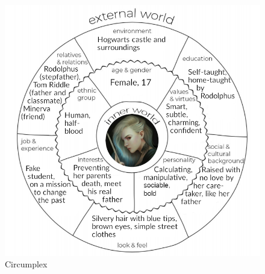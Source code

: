 \begin{figure}[H]
\includegraphics[max width=\textwidth]{../Pictures/Characters/Circumplexes/Delphini_circumplex.png} 
\captionsetup{labelformat=empty}
\caption{Circumplex}
\end{figure}

